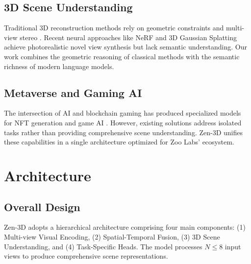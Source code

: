 \documentclass[11pt,a4paper]{article}
\begin{document}
\subsection{3D Scene Understanding}

Traditional 3D reconstruction methods rely on geometric constraints and multi-view stereo \cite{mvs}. Recent neural approaches like NeRF \cite{nerf} and 3D Gaussian Splatting \cite{3dgs} achieve photorealistic novel view synthesis but lack semantic understanding. Our work combines the geometric reasoning of classical methods with the semantic richness of modern language models.

\subsection{Metaverse and Gaming AI}

The intersection of AI and blockchain gaming has produced specialized models for NFT generation \cite{nftgan} and game AI \cite{gameai}. However, existing solutions address isolated tasks rather than providing comprehensive scene understanding. Zen-3D unifies these capabilities in a single architecture optimized for Zoo Labs' ecosystem.

\section{Architecture}

\subsection{Overall Design}

Zen-3D adopts a hierarchical architecture comprising four main components: (1) Multi-view Visual Encoding, (2) Spatial-Temporal Fusion, (3) 3D Scene Understanding, and (4) Task-Specific Heads. The model processes $N \leq 8$ input views to produce comprehensive scene representations.
\end{document}
